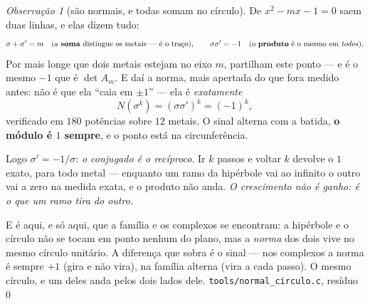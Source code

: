 \documentclass[11pt]{article}
\newcommand{\code}[1]{\texttt{\small #1}}
\theoremstyle{plain}
\theoremstyle{remark}
\newtheorem{obs}{Observação}
\begin{document}
\begin{obs}[são normais, e todas somam no círculo]\label{obs:circulo}
De $x^2-mx-1=0$ saem duas linhas, e elas dizem tudo:
\[
 \sigma+\sigma'=m \quad\text{(a \textbf{soma} distingue os metais --- é o traço)},\qquad
 \sigma\sigma'=-1 \quad\text{(o \textbf{produto} é o mesmo em \emph{todos})}.
\]
Por mais longe que dois metais estejam no eixo $m$, partilham este ponto --- e é o mesmo $-1$ que é
$\det A_m$. E daí a norma, mais apertada do que fora medido antes: não é que ela ``caia em
$\pm1$'' --- ela é \emph{exatamente}
\[
 N(\sigma^k)=(\sigma\sigma')^k=(-1)^k,
\]
verificado em $180$ potências sobre $12$ metais. O sinal alterna com a batida, \textbf{o módulo é
$1$ sempre}, e o ponto está na circunferência.

Logo $\sigma'=-1/\sigma$: \emph{o conjugado é o recíproco}. Ir $k$ passos e voltar $k$ devolve o
$1$ exato, para todo metal --- enquanto um ramo da hipérbole vai ao infinito o outro vai a zero na
medida exata, e o produto não anda. \emph{O crescimento não é ganho: é o que um ramo tira do outro.}

E é aqui, e só aqui, que a família e os complexos se encontram: a hipérbole e o círculo não se tocam
em ponto nenhum do plano, mas a \emph{norma} dos dois vive no mesmo círculo unitário. A diferença
que sobra é o sinal --- nos complexos a norma é sempre $+1$ (gira e não vira), na família alterna
(vira a cada passo). O mesmo círculo, e um deles anda pelos dois lados dele.
\hfill{\small\code{tools/normal\_circulo.c}, resíduo $0$}
\end{obs}
\end{document}
